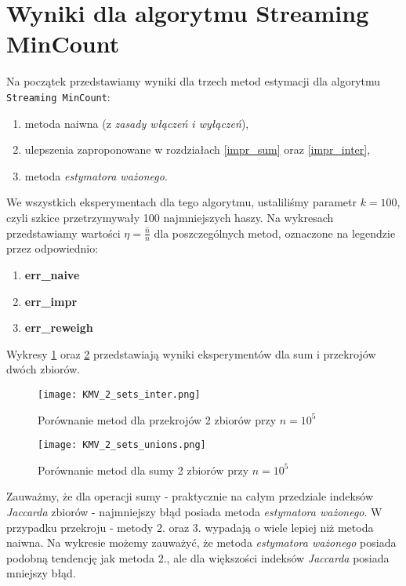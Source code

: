 \section{Wyniki dla algorytmu Streaming MinCount}
Na początek przedstawiamy wyniki dla trzech metod estymacji dla algorytmu \texttt{Streaming MinCount}:
\begin{enumerate}
	\item metoda naiwna (z \textit{zasady włączeń i wyłączeń}),
	\item ulepszenia zaproponowane w rozdziałach \ref{impr_sum} oraz \ref{impr_inter},
	\item metoda \textit{estymatora ważonego}.
\end{enumerate}
We wszystkich eksperymentach dla tego algorytmu, ustaliliśmy parametr $k = 100$, czyli szkice przetrzymywały 100 najmniejszych haszy.
Na wykresach przedstawiamy wartości $\eta = \frac{\hat{n}}{n}$ dla poszczególnych metod, oznaczone na legendzie przez odpowiednio:
\begin{enumerate}
	\item \textbf{err\_naive}
	\item \textbf{err\_impr}
	\item \textbf{err\_reweigh}
\end{enumerate}
Wykresy \ref{fig:KMV_2sets_inter} oraz \ref{fig:KMV_2sets_unions} przedstawiają wyniki eksperymentów dla sum i przekrojów dwóch zbiorów.

\begin{figure}[h!]
    \texttt{[image: KMV\_2\_sets\_inter.png]}
    \centering
    \caption{Porównanie metod dla przekrojów 2 zbiorów przy $n=10^5$}
    \label{fig:KMV_2sets_inter}
\end{figure}

\begin{figure}[h!]
    \texttt{[image: KMV\_2\_sets\_unions.png]}
    \centering
    \caption{Porównanie metod dla sumy 2 zbiorów przy $n=10^5$}
    \label{fig:KMV_2sets_unions}
\end{figure}

Zauważmy, że dla operacji sumy - praktycznie na całym przedziale indeksów \textit{Jaccarda} zbiorów - najmniejszy błąd posiada metoda \textit{estymatora ważonego}. W przypadku przekroju - metody $2.$ oraz $3.$ wypadają o wiele lepiej niż metoda naiwna. Na wykresie możemy zauważyć, że metoda \textit{estymatora ważonego} posiada podobną tendencję
jak metoda $2.$, ale dla większości indeksów \textit{Jaccarda} posiada mniejszy błąd.

